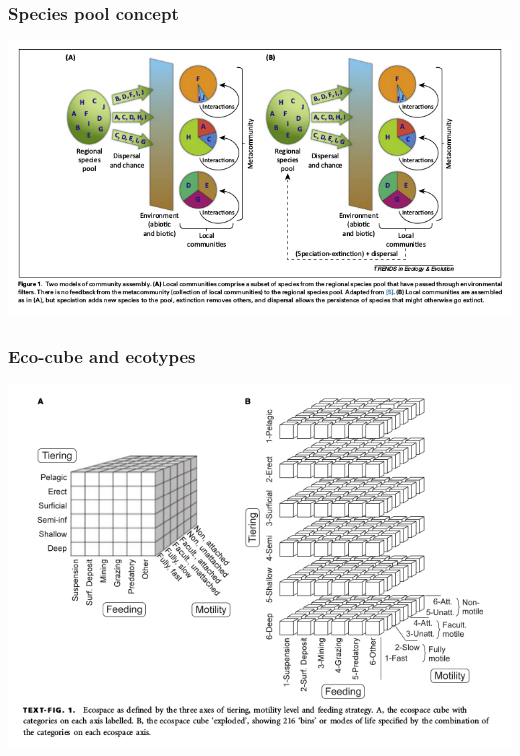 \documentclass{beamer}
\begin{document}
\begin{frame}
\begin{columns}
\begin{column}{0.5\textwidth}
    \end{column}
  \end{columns}

\end{frame}

\begin{frame}
  \frametitle{Species pool concept}

  \begin{center}
    \includegraphics[height=0.8\textheight,width=\textwidth,keepaspectratio=true]{figure/schemske_pool}
  \end{center}

\end{frame}

\begin{frame}
  \frametitle{Eco-cube and ecotypes}

  \begin{center}
    \includegraphics[height=0.8\textheight,width=\textwidth,keepaspectratio=true]{figure/ecocube}
  \end{center}

\end{frame}
\end{document}
